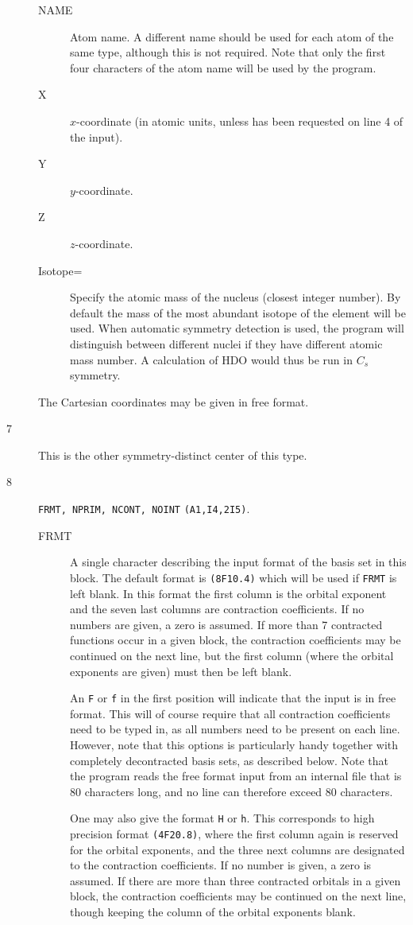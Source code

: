 \begin{description}
\begin{description}
\item[NAME] Atom name.  A different name should be used for
each atom of the same type, although this is not required. Note that
only the first four characters of the atom name will be used by the
program.
\item[X] $x$-coordinate (in atomic units, unless \angstrom{}
has been requested on line 4 of the input).
\item[Y] $y$-coordinate.
\item[Z] $z$-coordinate.
\item[Isotope=]  Specify the atomic mass of the nucleus (closest
  integer number). By default the mass of the most abundant isotope
  of the element will be used. When automatic symmetry detection is
  used, the program will distinguish between different nuclei if they
  have different atomic mass number. A calculation of HDO would thus
  be run in $C_s$ symmetry. 
\end{description}
The Cartesian coordinates may
be given in free format.
\item[7] This is the other symmetry-distinct center of this type.
\item[8] \verb|FRMT, NPRIM, NCONT, NOINT| {\tt (A1,I4,2I5)}.
\begin{description}
\item[FRMT] A single character describing the input format of the
basis set in this block. The default format is {\tt (8F10.4)} which
will be used if {\tt FRMT} is left blank. In this format
the first column is the orbital exponent and the seven last columns
are contraction coefficients. If no numbers are given, a zero is
assumed. If more than 7 contracted functions occur in a given block,
the contraction coefficients may be continued on the next line, but
the first column (where the orbital exponents are given) must then be
left blank.

An {\tt F} or {\tt f} in the first position will indicate that the
input is in free format. This will of course require that all
contraction coefficients need to be typed in, as all numbers need
to be present on each line. However, note that this options is
particularly handy together with completely decontracted basis
sets, as described below. Note that the program reads the free
format input from an internal file that is 80 characters long, and
no line can therefore exceed 80 characters.

One may also give the format {\tt H} or {\tt h}. This corresponds to
high precision format {\tt (4F20.8)}, where the first column again is
reserved for the orbital exponents, and the three next columns are
designated to the contraction coefficients. If no number is given, a zero
is assumed. If there are more than three contracted orbitals in a
given block, the contraction coefficients may be continued on the next
line, though keeping the column of the orbital exponents blank.


\end{description}
\end{description}
